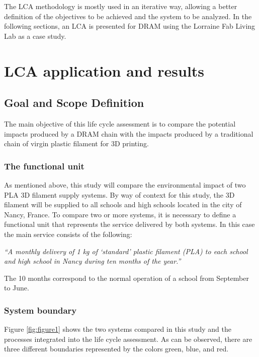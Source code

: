 \documentclass[12pt]{elsarticle} %
\begin{document}
The LCA methodology is mostly used in an iterative way, allowing a better definition of the objectives to be achieved and the system to be analyzed.
In the following sections, an LCA is presented for DRAM using the Lorraine Fab Living Lab as a case study.

\hypertarget{LCA}{%
\section{LCA application and results}\label{LCA}}

\hypertarget{goal-and-scope-definition}{%
\subsection{Goal and Scope Definition}\label{goal-and-scope-definition}}

The main objective of this life cycle assessment is to compare the potential impacts produced by a DRAM chain with the impacts produced by a traditional chain of virgin plastic filament for 3D printing.

\hypertarget{the-functional-unit}{%
\subsubsection{The functional unit}\label{the-functional-unit}}

As mentioned above, this study will compare the environmental impact of two PLA 3D filament supply systems. By way of context for this study, the 3D filament will be supplied to all schools and high schools located in the city of Nancy, France. To compare two or more systems, it is necessary to define a functional unit that represents the service delivered by both systems. In this case the main service consists of the following:

\emph{``A monthly delivery of 1 kg of `standard' plastic filament (PLA) to each school and high school in Nancy during ten months of the year.''}

The 10 months correspond to the normal operation of a school from September to June.

\hypertarget{system-boundary}{%
\subsubsection{System boundary}\label{system-boundary}}

Figure \ref{fig:figure1} shows the two systems compared in this study and the processes integrated into the life cycle assessment. As can be observed, there are three different boundaries represented by the colors green, blue, and red.
\end{document}
